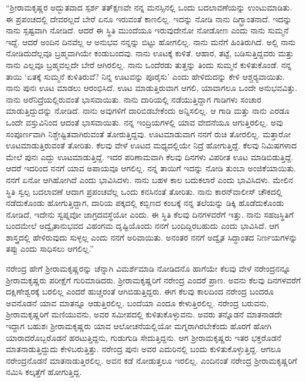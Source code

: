 “ಶ‍್ರೀರಾಮಕೃಷ್ಣರ ಅದ್ಭುತವಾದ ಸ್ಪರ್ಶ ‍ತತ್‍ಕ್ಷಣವೇ ನನ್ನ ಮನಸ್ಸಿನಲ್ಲಿ ಒಂದು ಬದಲಾವಣೆಯನ್ನು ಉಂಟುಮಾಡಿತು. ಈ ಪ್ರಪಂಚದಲ್ಲಿ ದೇವರಲ್ಲದೆ ಬೇರೆ ಏನೂ ಇರುವಂತೆ ಕಾಣಲಿಲ್ಲ. ಇದನ್ನು ನೋಡಿ ನಾನು ದಿಗ್ಭ್ರಾಂತನಾದೆ. ಇದನ್ನು ನಾನು ಸ್ಪಷ್ಟವಾಗಿ ನೋಡಿದೆ. ಆದರೆ ಈ ಸ್ಥಿತಿ ಮುಂದೆಯೂ ಇರುವುದೇನೋ ನೋಡೋಣ ಎಂದು ನಾನು ಸುಮ್ಮನೆ ಇದ್ದೆ. ಆದರೆ ಅಂದಿನ ದಿನವೆಲ್ಲ ಆ ಅನುಭವ ನನ್ನನ್ನು ಬಿಟ್ಟು ಹೋಗಲಿಲ್ಲ. ನಾನು ಮನೆಗೆ ಹಿಂತಿರುಗಿದೆ. ಅಲ್ಲಿ ನಾನು ನೋಡಿದುದೆಲ್ಲವೂ ಬ್ರಹ್ಮವಾಗಿಯೇ ಕಂಡುಬಂದವು. ನಾನು ಊಟಕ್ಕೆ ಕುಳಿತೆ. ಆಹಾರ, ತಟ್ಟೆ, ಬಡಿಸುತ್ತಿದ್ದವರು ಮತ್ತು ನಾನು ಎಲ್ಲವೂ ಬ್ರಹ್ಮವಲ್ಲದೇ ಬೇರೆ ಆಗಿರಲಿಲ್ಲ. ನಾನು ಒಂದೆರಡು ತುತ್ತನ್ನು ತಿಂದು ಸುಮ್ಮನೆ ಕುಳಿತುಕೊಂಡೆ. ನನ್ನ ತಾಯಿ ‘ಏತಕ್ಕೆ ಸುಮ್ಮನೆ ಕುಳಿತಿರುವೆ? ನಿನ್ನ ಊಟವನ್ನು ಪೂರೈಸು’ ಎಂದು ಹೇಳಿದುದನ್ನು ಕೇಳಿ ಆಶ್ಚರ‍್ಯವಾಯಿತು. ನಾನು ಪುನಃ ಊಟ ಮಾಡಲು ಆರಂಭಿಸಿದೆ. ಊಟ ಮಾಡುತ್ತಿರುವಾಗ ಆಗಲಿ, ಯಾವಾಗಲೂ ಒಂದೇ ಅನುಭವವಿತ್ತು. ನಾನು ಅರೆನಿದ್ರೆಯಲ್ಲಿರುವಂತೆ ಭಾಸವಾಯಿತು. ನಾನು ದಾರಿಯಲ್ಲಿ ನಡೆಯುತ್ತಿದ್ದಾಗ ಗಾಡಿಗಳು ಸಂಚಾರ ಮಾಡುತ್ತಿದ್ದುದನ್ನು ನೋಡಿದೆ. ನಾನು ಅವುಗಳಿಗೆ ದಾರಿಬಿಡಬೇಕೆಂದು ಅನ್ನಿಸಲಿಲ್ಲ. ಆ ಗಾಡಿ ಮತ್ತು ನಾನು ಎರಡೂ ಒಂದೇ ವಸ್ತುವಿನಿಂದ ಆದಂತೆ ಭಾಸವಾಯಿತು. ನನ್ನ ಇಂದ್ರಿಯಗಳಲ್ಲಿ ಯಾವ ವೇದನೆಯೂ ಆಗುತ್ತಿರಲಿಲ್ಲ. ಅವು ಸಂಪೂರ್ಣವಾಗಿ ನಿಶ್ಚೇಷ್ಟಿತವಾಗಿರುವಂತೆ ತೋರುತ್ತಿದ್ದವು. ಊಟಮಾಡುವಾಗ ನನಗೆ ರುಚಿ ತೋರಲಿಲ್ಲ. ಮತ್ತಾರೋ ಊಟಮಾಡುತ್ತಿರುವಂತೆ ತೋರಿತು. ಕೆಲವು ವೇಳೆ ಊಟದ ಮಧ್ಯದಲ್ಲಿಯೇ ನಿದ್ರೆ ಹೋಗುತ್ತಿದ್ದೆ. ಕೆಲವು ನಿಮಿಷಗಳಾದ ಮೇಲೆ ಪುನಃ ಎದ್ದು ಊಟಮಾಡುತ್ತಿದ್ದೆ. ಇದರ ಪರಿಣಾಮವಾಗಿ ಕೆಲವು ದಿನಗಳು ವಿಪರೀತ ಊಟ ಮಾಡಿಬಿಡುತ್ತಿದ್ದೆ. ಆದರೆ ಇದರಿಂದ ನನಗೆ ಯಾವ ಅಪಾಯವೂ ಆಗಲಿಲ್ಲ. ನನ್ನ ತಾಯಿಗೆ ಇದನ್ನು ನೋಡಿ ತುಂಬಾ ಅಂಜಿಕೆಯಾಯಿತು. ನನಗೆ ಏನೋ ಆಗಿಹೋಗಿದೆ ಎಂದು ಭಾವಿಸಿದಳು. ನಾನು ಬಹಳ ಕಾಲ ಬದುಕಲಾರೆ ಎಂದು ಭಾವಿಸಿದಳು. ಮೇಲಿನ ಸ್ಥಿತಿ ಸ್ವಲ್ಪ ಬದಲಾವಣೆ ಆದಾಗ ಪ್ರಪಂಚವೆಲ್ಲ ಒಂದು ಕನಸಿನಂತೆ ತೋರಿತು. ನಾನು ಕಾರನ್‍ವಾಲೀಸ್ ಚೌಕದಲ್ಲಿ ನಡೆದುಕೊಂಡು ಹೋಗುತ್ತಿದ್ದಾಗ, ದಾರಿಯ ಪಕ್ಕದಲ್ಲಿ ಕಬ್ಬಿಣದ ಕಂಬಕ್ಕೆ ನನ್ನ ತಲೆಯನ್ನು ಡಿಕ್ಕಿ ಹೊಡೆದುಕೊಂಡು ನೋಡಿದೆ, ಇದೇನು ಸ್ವಪ್ನವೋ ಜಾಗ್ರದವಸ್ಥೆಯೋ ಎಂದು. ಈ ಸ್ಥಿತಿ ಕೆಲವು ದಿನಗಳವರೆಗೆ ಇತ್ತು. ನಾನು ಸಹಜಸ್ಥಿತಿಗೆ ಬಂದಮೇಲೆ ಅದ್ವೈತಾನುಭವದ ವಿಹಂಗಮ ದೃಷ್ಟಿಯೊಂದು ನನಗೆ ಬಂದಿದ್ದಿರಬಹುದು ಎಂದು ಭಾವಿಸಿದೆ. ಆಗ ಶಾಸ್ತ್ರದಲ್ಲಿ ಹೇಳಿರುವುದು ಸುಳ್ಳಲ್ಲ ಎಂದು ನನಗೆ ಅರಿವಾಯಿತು. ಅನಂತರ ನನಗೆ ಅದ್ವೈತ ಸಿದ್ಧಾಂತದ ನಿರ್ಣಯಗಳನ್ನು ತಪ್ಪು ಎಂದು ಸಾಧಿಸಲು ಆಗಲಿಲ್ಲ.”

\vskip 3pt

ನರೇಂದ್ರ ಹೇಗೆ ಶ‍್ರೀರಾಮಕೃಷ್ಣರನ್ನು ಚೆನ್ನಾಗಿ ವಿಮರ್ಶೆಮಾಡಿ ನೋಡಿದನೊ ಹಾಗೆಯೇ ಕೆಲವು ವೇಳೆ ನರೇಂದ್ರನನ್ನೂ ಶ‍್ರೀರಾಮಕೃಷ್ಣರು ಪರೀಕ್ಷೆಗೆ ಗುರಿಮಾಡಿದರು. ಶ‍್ರೀರಾಮಕೃಷ್ಣರಿಗೆ ನರೇಂದ್ರ ಎಂದರೆ ಪ್ರಾಣ. ಅವನು ಕೆಲವು ದಿನಗಳವರೆಗೆ ದಕ್ಷಿಣೇಶ್ವರಕ್ಕೆ ಬರಲಿಲ್ಲ ಎಂದರೆ ಹುಚ್ಚರಂತೆ ಆಗಿಬಿಡುತ್ತಿದ್ದರು. ಈಗ ಕೆಲವು ಕಾಲದಿಂದ ನರೇಂದ್ರ ಬಂದರೂ ಅವನೊಡನೆ ಯಾವ ಮಾತನ್ನೂ ಆಡುತ್ತಿರಲಿಲ್ಲ. ಬಂದೆಯಾ ಎಂದೂ ಕೇಳುತ್ತಿರಲಿಲ್ಲ. ನರೇಂದ್ರ ಬರುವನು, ಶ‍್ರೀರಾಮಕೃಷ್ಣರಿಗೆ ಮಣಿಯುವನು, ಅವರ ಸಮೀಪದಲ್ಲಿ ಕುಳಿತುಕೊಳ್ಳುವನು. ಅವರು ತನ್ನೊಡನೆ ಮಾತನಾಡದೇ ಇದ್ದಾಗ ಬಹುಶಃ ಶ‍್ರೀರಾಮಕೃಷ್ಣರು ಯಾವ ಆಲೋಚನೆಯಲ್ಲಿಯೋ ಮಗ್ನರಾಗಿರಬೇಕೆಂದು ಹೊರಗೆ ಹೋಗಿ ಯಾರಾದರೊಬ್ಬರೊಡನೆ ಹರಟುತ್ತಿದ್ದನು, ಗುಡುಗುಡಿ ಸೇದುತ್ತಿದ್ದನು. ಆಗ ಶ‍್ರೀರಾಮಕೃಷ್ಣರು ಇತರ ಭಕ್ತರೊಡನೆ ಮಾತನಾಡುತ್ತಿದ್ದುದು ಕೇಳಿಬರುತ್ತಿತ್ತು. ನರೇಂದ್ರ ಪುನಃ ಅವರ ಎದುರಿನಲ್ಲಿ ಬಂದು ಕುಳಿತುಕೊಳ್ಳುತ್ತಿದ್ದ. ಆಗಲೂ ನರೇಂದ್ರನೊಡನೆ ಮಾತನಾಡುತ್ತಿರಲಿಲ್ಲ. ಅವನ ಕಡೆ ನೋಡುತ್ತಲೂ ಇರಲಿಲ್ಲ. ಎಂದಿನಂತೆ ನರೇಂದ್ರ ಶ‍್ರೀರಾಮಕೃಷ್ಣರಿಗೆ ನಮಿಸಿ ಕಲ್ಕತ್ತೆಗೆ ಹೋಗುತ್ತಿದ್ದ.

